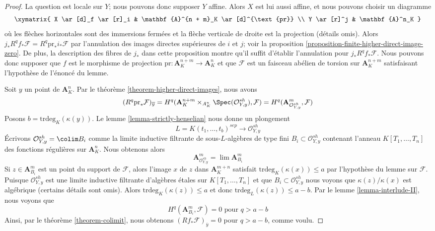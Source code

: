 \begin{proof}
La question est locale sur $Y$; nous pouvons donc supposer $Y$ affine.
Alors $X$ est lui aussi affine, et nous pouvons choisir un diagramme
$$
\xymatrix{
X \ar[d]_f \ar[r]_i & \mathbf{A}^{n + m}_K \ar[d]^{\text{pr}} \\
Y \ar[r]^j & \mathbf{A}^n_K
}
$$
où les flèches horizontales sont des immersions fermées et la flèche
verticale de droite est la projection (détails omis).
Alors $j_*R^qf_*\mathcal{F} = R^q\text{pr}_*i_*\mathcal{F}$
par l'annulation des images directes supérieures de $i$ et $j$; voir la
proposition \ref{proposition-finite-higher-direct-image-zero}.
De plus, la description des fibres de $j_*$ dans cette proposition
montre qu'il suffit d'établir l'annulation pour $j_*R^qf_*\mathcal{F}$.
Nous pouvons donc supposer que $f$ est le morphisme de
projection $\text{pr} : \mathbf{A}^{n + m}_K \to \mathbf{A}^n_K$
et que $\mathcal{F}$ est un faisceau abélien de torsion sur $\mathbf{A}^{n + m}_K$
satisfaisant l'hypothèse de l'énoncé du lemme.

\medskip\noindent
Soit $y$ un point de $\mathbf{A}^n_K$.
Par le théorème \ref{theorem-higher-direct-images}, nous avons
$$
(R^q\text{pr}_*\mathcal{F})_{\overline{y}} =
H^q(\mathbf{A}^{n + m}_K \times_{A^n_K} \Spec(\mathcal{O}_{Y, y}^{sh}),
\mathcal{F}) =
H^q(\mathbf{A}^m_{\mathcal{O}_{Y, y}^{sh}}, \mathcal{F})
$$
Posons $b = \text{trdeg}_K(\kappa(y))$. Le lemme \ref{lemma-strictly-henselian}
nous donne un plongement
$$
L = K(t_1, \ldots, t_b)^{sep} \longrightarrow \mathcal{O}_{Y, y}^{sh}
$$
Écrivons $\mathcal{O}_{Y, y}^{sh} = \colim B_i$ comme la limite
inductive filtrante de sous-$L$-algèbres de type fini $B_i \subset \mathcal{O}_{Y, y}^{sh}$
contenant l'anneau $K[T_1, \ldots, T_n]$ des fonctions régulières
sur $\mathbf{A}^n_K$. Nous obtenons alors
$$
\mathbf{A}^m_{\mathcal{O}_{Y, y}^{sh}} =
\lim \mathbf{A}^m_{B_i}
$$
Si $z \in \mathbf{A}^m_{B_i}$ est un point du support de
$\mathcal{F}$, alors l'image $x$ de $z$ dans $\mathbf{A}^{m + n}_K$
satisfait $\text{trdeg}_K(\kappa(x)) \leq a$ par l'hypothèse du lemme sur
$\mathcal{F}$.
Puisque $\mathcal{O}_{Y, y}^{sh}$ est une limite inductive filtrante
d'algèbres étales sur $K[T_1, \ldots, T_n]$ et que
$B_i \subset \mathcal{O}_{Y, y}^{sh}$
nous voyons que $\kappa(z)/\kappa(x)$ est algébrique
(certains détails sont omis). Alors $\text{trdeg}_K(\kappa(z)) \leq a$
et donc $\text{trdeg}_L(\kappa(z)) \leq a - b$.
Par le lemme \ref{lemma-interlude-II}, nous voyons que
$$
H^q(\mathbf{A}^m_{B_i}, \mathcal{F}) = 0\text{ pour }q > a - b
$$
Ainsi, par le théorème \ref{theorem-colimit}, nous obtenons
$(Rf_*\mathcal{F})_{\overline{y}} = 0$ pour $q > a - b$,
comme voulu.
\end{proof}









